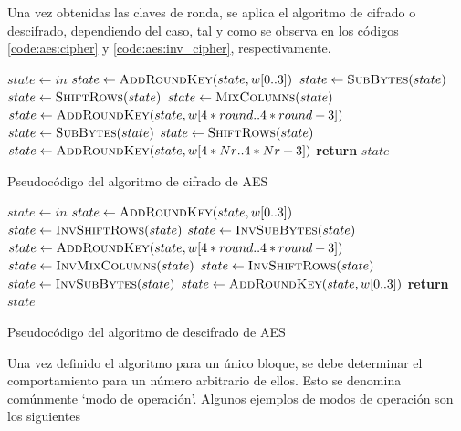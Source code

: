 \documentclass[11pt]{article}
\renewcommand*\Call[2]{\textproc{#1}(#2)}
\begin{document}
Una vez obtenidas las claves de ronda, se aplica el algoritmo de cifrado o descifrado, dependiendo del caso, tal y como se observa en los códigos \ref{code:aes:cipher} y \ref{code:aes:inv_cipher}, respectivamente.

\begin{listing}[h] %
\begin{algorithmic}
    \State $state \gets in$
    \State $state \gets \Call{AddRoundKey}{state, w[0\text{..}3]}$
        \State $state \gets \Call{SubBytes}{state}$
        \State $state \gets \Call{ShiftRows}{state}$
        \State $state \gets \Call{MixColumns}{state}$
        \State $state \gets \Call{AddRoundKey}{state, w[4*round\text{..}4*round + 3]}$
    \EndFor
    \State $state \gets \Call{SubBytes}{state}$
    \State $state \gets \Call{ShiftRows}{state}$
    \State $state \gets \Call{AddRoundKey}{state,w[4*Nr\text{..}4*Nr+3]}$
    \State \textbf{return} $state$
\EndProcedure
\end{algorithmic}
\caption{Pseudocódigo del algoritmo de cifrado de AES}
\label{code:aes:cipher}
\end{listing}

\begin{listing}[h] %
\begin{algorithmic}
    \State $state \gets in$
    \State $state \gets \Call{AddRoundKey}{state, w[0\text{..}3]}$
        \State $state \gets \Call{InvShiftRows}{state}$
        \State $state \gets \Call{InvSubBytes}{state}$
        \State $state \gets \Call{AddRoundKey}{state, w[4*round\text{..}4*round + 3]}$
        \State $state \gets \Call{InvMixColumns}{state}$
    \EndFor
    \State $state \gets \Call{InvShiftRows}{state}$
    \State $state \gets \Call{InvSubBytes}{state}$
    \State $state \gets \Call{AddRoundKey}{state,w[0\text{..}3]}$
    \State \textbf{return} $state$
\EndProcedure
\end{algorithmic}
\caption{Pseudocódigo del algoritmo de descifrado de AES}
\label{code:aes:inv_cipher}
\end{listing}

Una vez definido el algoritmo para un único bloque, se debe determinar el comportamiento para un número arbitrario de ellos. Esto se denomina comúnmente `modo de operación'. Algunos ejemplos de modos de operación son los siguientes
\end{document}
